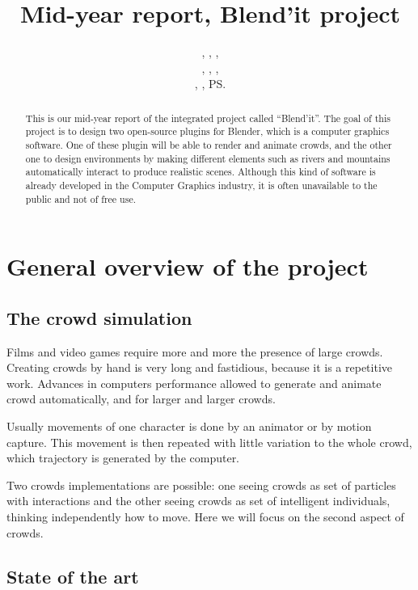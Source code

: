 \documentclass[a4paper,11pt]{article}
\title{Mid-year report, Blend'it project}
\author{\bb, \gc, \dl,\\ \vl, \om, \mr,\\ \me, \js, \ps}
\begin{document}
\maketitle

\begin{abstract}
This is our mid-year  report of the integrated project called ``Blend'it''. The goal of this project is to design two open-source plugins for Blender, which is a computer graphics software. One of these plugin will be able to render and animate crowds, and the other one to design environments by making different elements such as rivers and mountains automatically interact to produce realistic scenes. Although this kind of software is already developed in the Computer Graphics industry, it is often unavailable to the public and not of free use.
\end{abstract}


\tableofcontents

\newpage

\section{General overview of the project}

\subsection{The crowd simulation}
Films and video games require more and more the presence of large crowds. Creating crowds by hand is very long and fastidious, because it is a repetitive work. Advances in computers performance allowed to generate and animate crowd automatically, and for larger and larger crowds.

Usually movements of one character is done by an animator or by motion capture. This movement is then repeated with little variation to the whole crowd, which trajectory is generated by the computer.

Two crowds implementations are possible: one seeing crowds as set of particles with interactions and the other seeing crowds as set of intelligent individuals, thinking independently how to move. Here we will focus on the second aspect of crowds.


\subsection{State of the art}
\end{document}
